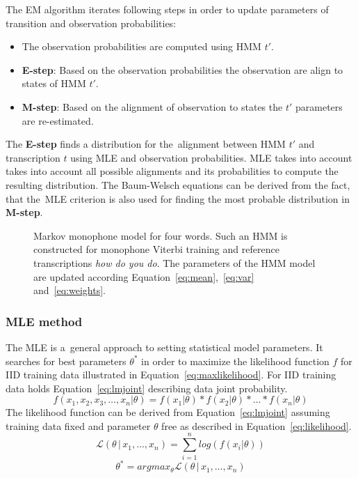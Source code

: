 The \ac{EM} algorithm iterates following steps in order to update parameters of transition and observation probabilities:
\begin{itemize}
    \item The observation probabilities are computed using \ac{HMM} $t'$. 
    \item {\bf E-step}: Based on the observation probabilities the observation are align to states of \ac{HMM} $t'$. 
    \item {\bf M-step}: Based on the alignment of observation to states the $t'$ parameters are re-estimated. 
\end{itemize}

The {\bf E-step} finds a distribution for the~alignment between \ac{HMM} $t'$ and transcription $t$ using \ac{MLE}\cite{gopinath1998maximum} and observation probabilities.
\ac{MLE} takes into account takes into account all possible alignments and its probabilities to compute the resulting distribution.
The Baum-Welsch equations can be derived from the fact, that the~\ac{MLE} criterion is also used for finding the most probable distribution in {\bf M-step}.\cite{huang2001spoken}

\begin{figure}[!htp]
    \begin{center}
    
    \caption{Markov monophone model for four words. Such an \ac{HMM} is constructed for monophone Viterbi training and reference transcriptions \textit{how do you do}. The parameters of the \ac{HMM} model are updated according Equation~\ref{eq:mean},~\ref{eq:var} and~\ref{eq:weights}.}
    \label{fig:hmm_words} 
    \end{center}
\end{figure}

\subsubsection*{\acl{MLE} method}
\label{sub:mle_method}
The \ac{MLE} is a~general approach to setting statistical model parameters.
It searches for best parameters $\theta^*$ in order to maximize the likelihood function $f$ for \ac{IID} training data illustrated in Equation~\ref{eq:maxlikelihood}.
For \ac{IID} training data holds Equation~\ref{eq:lmjoint} describing data joint probability. 
\begin{equation}\label{eq:lmjoint}
    f(x_1, x_2, x_3, \ldots, x_n | \theta) = f(x_1 | \theta) * f(x_2 | \theta) * \ldots * f(x_n | \theta)
\end{equation}
The likelihood function can be derived from Equation~\ref{eq:lmjoint} assuming training data fixed and parameter $\theta$ free as described in Equation~\ref{eq:likelihood}.
\begin{equation}\label{eq:likelihood}
    \mathcal{L}(\theta\,|\,x_1,\ldots,x_n) = \sum_{i=1}^n log(f(x_i|\theta))
\end{equation}
\begin{equation}\label{eq:maxlikelihood}
    \theta^* = argmax_{\theta} \mathcal{L}(\theta\,|\,x_1,\ldots,x_n)
\end{equation}

